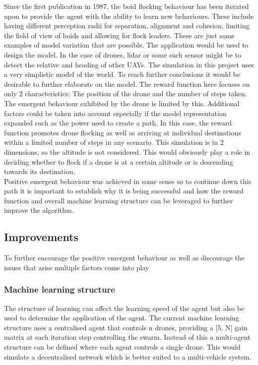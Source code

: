 \noindent
Since the first publication in 1987\cite{boid0}, the boid flocking behaviour has been iterated upon to provide the agent with the ability to learn new behaviours. These include having different perception radii for separation, alignment and cohesion, limiting the field of view of boids and allowing for flock leaders.\cite{boid1} These are just some examples of model variation that are possible. The application would be used to design the model. In the case of drones, lidar or some such sensor might be to detect the relative and heading of other UAVs. The simulation in this project uses a very simplistic model of the world. To reach further conclusions it would be desirable to further elaborate on the model.
The reward function here focuses on only 2  characteristics: The position of the drone and the number of steps  taken. The emergent behaviour exhibited by the drone is limited by this. Additional factors could be taken into account especially if the model representation expanded such as the power used to create a path.
In this case, the reward function promotes drone flocking as well as arriving at individual destinations within a limited number of steps in any scenario. This simulation is in 2 dimensions, so the altitude is not considered. This would obviously play a role in deciding whether to flock if a drone is at a certain altitude or is descending towards its destination.\\
Positive emergent behaviour was achieved in some sense so to continue down this path it is important to establish why it is being successful and how the reward function and overall machine learning structure can be leveraged to further improve the algorithm.

\subsection{Improvements}
To further encourage the positive emergent behaviour as well as discourage the issues that arise multiple factors come into play

\subsubsection{Machine learning structure}

The structure of learning can affect the learning speed of the agent but also be used to determine the application of the agent. The current machine learning structure uses a centralised agent that controls n drones, providing a [5, N] gain matrix at each iteration step controlling the swarm. Instead of this a multi-agent structure can be defined where each agent controls a single drone. This would simulate a decentralised network which is better suited to a multi-vehicle system.

